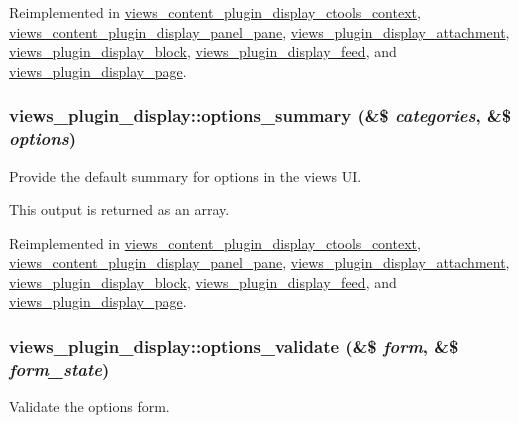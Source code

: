 Reimplemented in \hyperlink{classviews__content__plugin__display__ctools__context_a8fa3f9293bec2891e2e87249ad748c67}{views\_\-content\_\-plugin\_\-display\_\-ctools\_\-context}, \hyperlink{classviews__content__plugin__display__panel__pane_a5ee46f64275ee0fe1865b98f1b7811bf}{views\_\-content\_\-plugin\_\-display\_\-panel\_\-pane}, \hyperlink{classviews__plugin__display__attachment_a63219dfd2bfed59bdf1840d704d11799}{views\_\-plugin\_\-display\_\-attachment}, \hyperlink{classviews__plugin__display__block_aaac31f678cc192896bcfdeb1a8a5a2c7}{views\_\-plugin\_\-display\_\-block}, \hyperlink{classviews__plugin__display__feed_ab7cca15934456ddb26045f03483899fb}{views\_\-plugin\_\-display\_\-feed}, and \hyperlink{classviews__plugin__display__page_a9b03d35a15fcfcae4a474ea56b6ca5b6}{views\_\-plugin\_\-display\_\-page}.\hypertarget{classviews__plugin__display_a7a2f2aeedfc14816815e3ce65a61aedf}{
\subsubsection[{options\_\-summary}]{\setlength{\rightskip}{0pt plus 5cm}views\_\-plugin\_\-display::options\_\-summary (\&\$ {\em categories}, \/  \&\$ {\em options})}}
\label{classviews__plugin__display_a7a2f2aeedfc14816815e3ce65a61aedf}
Provide the default summary for options in the views UI.

This output is returned as an array. 

Reimplemented in \hyperlink{classviews__content__plugin__display__ctools__context_a3299f180dd1ea735064cb7d63fd61774}{views\_\-content\_\-plugin\_\-display\_\-ctools\_\-context}, \hyperlink{classviews__content__plugin__display__panel__pane_aa93bc6c55f47c07f6d36695bea916b43}{views\_\-content\_\-plugin\_\-display\_\-panel\_\-pane}, \hyperlink{classviews__plugin__display__attachment_a0d54f6bd68c3ebba7af03cd7ac722fe0}{views\_\-plugin\_\-display\_\-attachment}, \hyperlink{classviews__plugin__display__block_a52bb2499272275963128bb2beb5804ce}{views\_\-plugin\_\-display\_\-block}, \hyperlink{classviews__plugin__display__feed_a5c0b5faad36090985c85b16a454023a6}{views\_\-plugin\_\-display\_\-feed}, and \hyperlink{classviews__plugin__display__page_a47de087f3201600b057e0d4a55eef48c}{views\_\-plugin\_\-display\_\-page}.\hypertarget{classviews__plugin__display_a0b4336df4db25dec552de8d20141a9f5}{
\subsubsection[{options\_\-validate}]{\setlength{\rightskip}{0pt plus 5cm}views\_\-plugin\_\-display::options\_\-validate (\&\$ {\em form}, \/  \&\$ {\em form\_\-state})}}
\label{classviews__plugin__display_a0b4336df4db25dec552de8d20141a9f5}
Validate the options form. 

